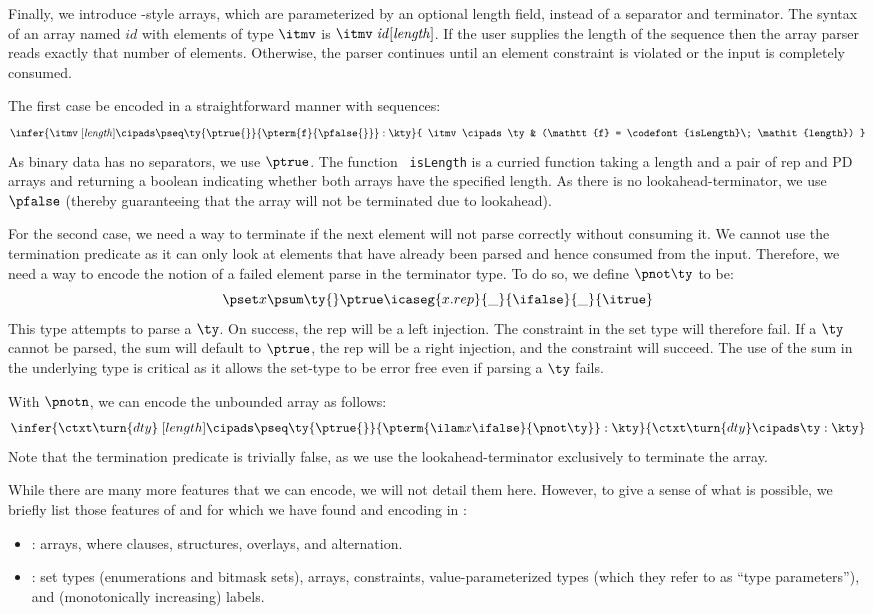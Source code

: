 Finally, we introduce \datascript{}-style arrays, which are
parameterized by an optional length field, instead of a separator and
terminator. The syntax of an array named $\mathit{id}$ with elements
of type $\itmv$ is $\itmv\; \mathit{id}[\mathit{length}]$. If the user
supplies the length of the sequence then the array parser reads
exactly that number of elements.  Otherwise, the parser continues
until an element constraint is violated or the input is completely
consumed.

The first case be encoded in a straightforward manner with \ddc{}
sequences: 
\[
  \infer{
    \itmv \; [\mathit{length}] \cipads 
    \pseq \ty {\ptrue{}} {\pterm {\mathtt{f}} {\pfalse{}}} : \kty
  }{ 
    \itmv \cipads \ty & 
    (\mathtt{f} = \codefont{isLength}\; \mathit{length})
  }
\]
As binary data has no separators, we use $\ptrue$. The function {\tt
  isLength} is a curried function taking a length and a pair of rep
and PD arrays and returning a boolean indicating whether both arrays
have the specified length. As there is no lookahead-terminator, we use
$\pfalse$ (thereby guaranteeing that the array will not be terminated
due to lookahead).

For the second case, we need a way to terminate if the next element
will not parse correctly without consuming it. We cannot use the
termination predicate as it can only look at elements that have
already been parsed and hence consumed from the input. Therefore, we
need a way to encode the notion of a failed element parse in the
terminator type. To do so, we define $\pnot \ty$ to be:
 {\small
\[
\pset x {\psum \ty {} \ptrue} {\icaseg {x.rep} {\_}
  {\ifalse} {\_} {\itrue}}
\]}
\noindent
This type attempts to parse a $\ty$. On success, the rep will be a left
injection. The constraint in the set type will therefore fail. If a
$\ty$ cannot be parsed, the sum will default to $\ptrue$, the rep will
be a right injection, and the constraint will succeed. The use of the
sum in the underlying type is critical as it allows the set-type to be
error free even if parsing a $\ty$ fails.

With $\pnotn$, we can encode the unbounded \datascript{} array as
follows:
\[
  \infer{
    \ctxt \turn {dty} \; [{length}] \cipads 
    \pseq \ty {\ptrue{}} {\pterm {\ilam x {} \ifalse} {\pnot \ty}} : \kty
  }{ 
    \ctxt \turn {dty} \cipads \ty : \kty 
  }
\]
Note that the termination predicate is trivially false, as we use the
lookahead-terminator exclusively to terminate the array.

While there are many more features that we can encode, we will not
detail them here. However, to give a sense of what is possible, we
briefly list those features of \datascript{} and \packettypes{} for
which we have found and encoding in \ddc{}:
\begin{itemize}
\item \packettypes{}: arrays, where clauses, structures, overlays,
  and alternation.
\item \datascript{}: set types (enumerations and bitmask sets),
  arrays, constraints, value-parameterized types (which they refer to
  as ``type parameters''), and (monotonically increasing) labels.
\end{itemize}

